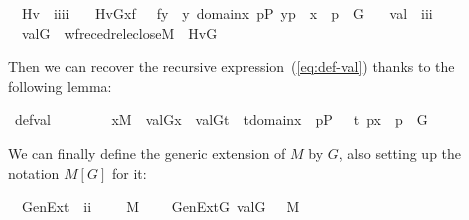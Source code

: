 \begin{isabelle}
\isamarkupfalse%
\isanewline
\ \ Hv\ {\isacharcolon}{\isacharcolon}\ {\isachardoublequoteopen}i{\isasymRightarrow}i{\isasymRightarrow}i{\isasymRightarrow}i{\isachardoublequoteclose}\ \isanewline
\ \ {\isachardoublequoteopen}Hv{\isacharparenleft}G{\isacharcomma}x{\isacharcomma}f{\isacharparenright}\ {\isacharequal}{\isacharequal}\ {\isacharbraceleft}\ f{\isacharbackquote}y\ {\isachardot}{\isachardot}\ y{\isasymin}\ domain{\isacharparenleft}x{\isacharparenright}{\isacharcomma}\ {\isasymexists}p{\isasymin}P{\isachardot}\ {\isacharless}y{\isacharcomma}p{\isachargreater}\ {\isasymin}\ x\ {\isasymand}\ p\ {\isasymin}\ G\ {\isacharbraceright}{\isachardoublequoteclose}\isanewline
\isanewline
{}\isamarkupfalse%
\isanewline
\ \ val\ {\isacharcolon}{\isacharcolon}\ {\isachardoublequoteopen}i{\isasymRightarrow}i{\isasymRightarrow}i{\isachardoublequoteclose}\ \isanewline
\ \ {\isachardoublequoteopen}val{\isacharparenleft}G{\isacharcomma}{\isasymtau}{\isacharparenright}\ {\isacharequal}{\isacharequal}\ wfrec{\isacharparenleft}edrel{\isacharparenleft}eclose{\isacharparenleft}M{\isacharparenright}{\isacharparenright}{\isacharcomma}\ {\isasymtau}{\isacharcomma}\ Hv{\isacharparenleft}G{\isacharparenright}{\isacharparenright}{\isachardoublequoteclose}
\end{isabelle}
Then we can recover the recursive expression~(\ref{eq:def-val}) thanks to the
following lemma:
%
\begin{isabelle}
\isamarkupfalse%
\ def{\isacharunderscore}val{\isacharcolon}
\isanewline
\ \ \ \ \ \ \ \  {\isachardoublequoteopen}x{\isasymin}M\ {\isasymLongrightarrow}\ val{\isacharparenleft}G{\isacharcomma}x{\isacharparenright}\ {\isacharequal}\ {\isacharbraceleft}val{\isacharparenleft}G{\isacharcomma}t{\isacharparenright}\ {\isachardot}{\isachardot}\ t{\isasymin}domain{\isacharparenleft}x{\isacharparenright}\ {\isacharcomma}\ {\isasymexists}p{\isasymin}P\ {\isachardot}\ \ {\isasymlangle}t{\isacharcomma}\ p{\isasymrangle}{\isasymin}x\ {\isasymand}\ p\ {\isasymin}\ G\ {\isacharbraceright}{\isachardoublequoteclose}
\end{isabelle}

We can finally define the generic extension of $M$ by $G$, also
setting up the notation $M[G]$ for it:
\begin{isabelle}
\isamarkupfalse%
\isanewline
\ \ GenExt\ {\isacharcolon}{\isacharcolon}\ {\isachardoublequoteopen}i{\isasymRightarrow}i{\isachardoublequoteclose}\ \ \ \ \ {\isacharparenleft}{\isachardoublequoteopen}M{\isacharbrackleft}{\isacharunderscore}{\isacharbrackright}{\isachardoublequoteclose}\ {}{}{\isacharparenright}\  \isanewline
\ \ {\isachardoublequoteopen}GenExt{\isacharparenleft}G{\isacharparenright}{\isacharequal}{\isacharequal}\ {\isacharbraceleft}val{\isacharparenleft}G{\isacharcomma}{\isasymtau}{\isacharparenright}{\isachardot}\ {\isasymtau}\ {\isasymin}\ M{\isacharbraceright}{\isachardoublequoteclose}
\end{isabelle}

